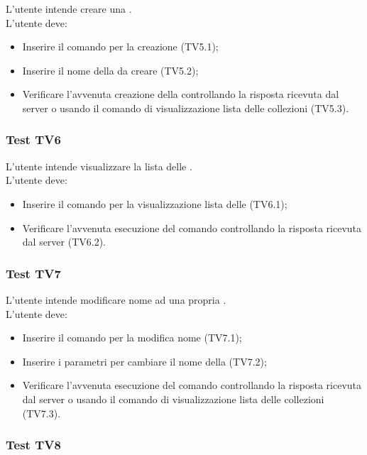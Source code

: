 \documentclass{scalatekids-article}
\begin{document}
L'utente intende creare una .\\
L'utente deve:
\begin{itemize}
\item Inserire il comando per la creazione  (TV5.1);
\item Inserire il nome della  da creare (TV5.2);
\item Verificare l'avvenuta creazione della  controllando la 
risposta ricevuta dal server o usando il comando di visualizzazione 
lista delle collezioni (TV5.3).
\end{itemize}

\subsubsection{Test TV6}

L'utente intende visualizzare la lista delle .\\
L'utente deve:
\begin{itemize}
\item Inserire il comando per la visualizzazione lista delle  (TV6.1);
\item Verificare l'avvenuta esecuzione del comando controllando la risposta ricevuta dal server (TV6.2).
\end{itemize}

\subsubsection{Test TV7}

L'utente intende modificare nome ad una propria .\\
L'utente deve:
\begin{itemize}
\item Inserire il comando per la modifica nome  (TV7.1);
\item Inserire i parametri per cambiare il nome della  (TV7.2);
\item Verificare l'avvenuta esecuzione del comando controllando la risposta ricevuta dal server o usando il comando di visualizzazione lista delle collezioni (TV7.3).
\end{itemize}

\subsubsection{Test TV8}
\end{document}
